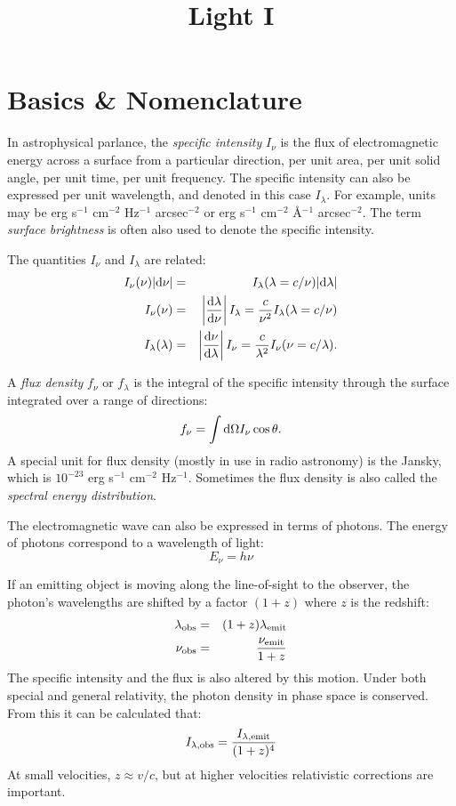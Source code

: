 \title{\bf Light I}

\section{Basics \& Nomenclature}

In astrophysical parlance, the {\it specific intensity} $I_\nu$ is the
flux of electromagnetic energy across a surface from a particular
direction, per unit area, per unit solid angle, per unit time, per
unit frequency. The specific intensity can also be expressed per unit
wavelength, and denoted in this case $I_\lambda$. For example, units
may be erg s$^{-1}$ cm$^{-2}$ Hz$^{-1}$ arcsec$^{-2}$ or erg s$^{-1}$
cm$^{-2}$ \AA$^{-1}$ arcsec$^{-2}$.  The term {\it surface brightness}
is often also used to denote the specific intensity.

The quantities $I_\nu$ and $I_\lambda$ are related:
\begin{eqnarray}
I_\nu(\nu) |{\rm d}\nu| &=& I_\lambda(\lambda = c/\nu) |{\rm
  d}\lambda| \cr
I_\nu(\nu) &=& \left|\frac{{\rm d}\lambda}{{\rm d}\nu}\right|
I_\lambda = \frac{c}{\nu^2} I_\lambda(\lambda = c/\nu) \cr
I_\lambda(\lambda) &=& \left|\frac{{\rm d}\nu}{{\rm d}\lambda}\right|
I_\nu = \frac{c}{\lambda^2} I_\nu(\nu = c/\lambda).
\end{eqnarray}

A {\it flux density} $f_\nu$ or $f_\lambda$ is the integral of the
specific intensity through the surface integrated over a range of
directions:
\begin{equation}
f_\nu = \int {\rm d}\Omega I_\nu \cos\theta. 
\end{equation}
A special unit for flux density (mostly in use in radio astronomy) is
the Jansky, which is $10^{-23}$ erg s$^{-1}$ cm$^{-2}$
Hz$^{-1}$. Sometimes the flux density is also called the {\it spectral
  energy distribution}.

The electromagnetic wave can also be expressed in terms of
photons. The energy of photons correspond to a wavelength of light:
\begin{equation}
E_\nu = h\nu
\end{equation}

If an emitting object is moving along the line-of-sight to the
observer, the photon's wavelengths are shifted by a factor $(1+z)$
where $z$ is the redshift:
\begin{eqnarray}
\lambda_{\rm obs}  &=& (1+z) \lambda_{\rm emit} \cr
\nu_{\rm obs}  &=& \frac{\nu_{\rm emit}}{1+z}
\end{eqnarray}
The specific intensity and the flux is also altered by this
motion. Under both special and general relativity, the photon density
in phase space is conserved. From this it can be calculated that:
\begin{equation}
  \label{eq:sb_dimming}
  I_{\lambda, {\rm obs}} = 
  \frac{I_{\lambda, {\rm emit}}}{(1+z)^4}
\end{equation}
At small velocities, $z \approx v/c$, but at higher velocities
relativistic corrections are important.


